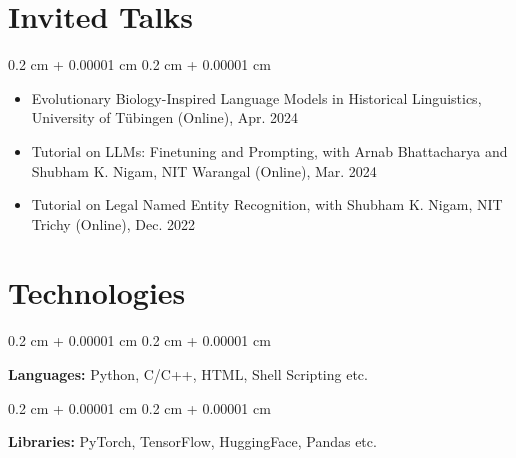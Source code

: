 \documentclass[10pt, letterpaper]{article}
\newenvironment{highlightsforbulletentries}{
    \begin{itemize}[
        topsep=0.10 cm,
        parsep=0.10 cm,
        partopsep=0pt,
        itemsep=0pt,
        leftmargin=10pt
    ]
}{
    \end{itemize}
} %
\newenvironment{onecolentry}{
    \begin{adjustwidth}{
        0.2 cm + 0.00001 cm
    }{
        0.2 cm + 0.00001 cm
    }
}{
    \end{adjustwidth}
} %
\begin{document}
    
    \section{Invited Talks}

    \begin{onecolentry}
        \begin{highlightsforbulletentries}


        \item Evolutionary Biology-Inspired Language Models in Historical Linguistics, University of Tübingen (Online), Apr. 2024

        \item Tutorial on LLMs: Finetuning and Prompting, with Arnab Bhattacharya and Shubham K. Nigam, NIT Warangal (Online), Mar. 2024

        \item Tutorial on Legal Named Entity Recognition, with Shubham K. Nigam, NIT Trichy (Online), Dec. 2022


        \end{highlightsforbulletentries}
    \end{onecolentry}

    \section{Technologies}



        
        \begin{onecolentry}
            \textbf{Languages:} Python, C/C++, HTML, Shell Scripting etc.
        \end{onecolentry}

        \vspace{0.2 cm}

        \begin{onecolentry}
            \textbf{Libraries:} PyTorch, TensorFlow, HuggingFace, Pandas etc.
        \end{onecolentry}


    
\end{document}

